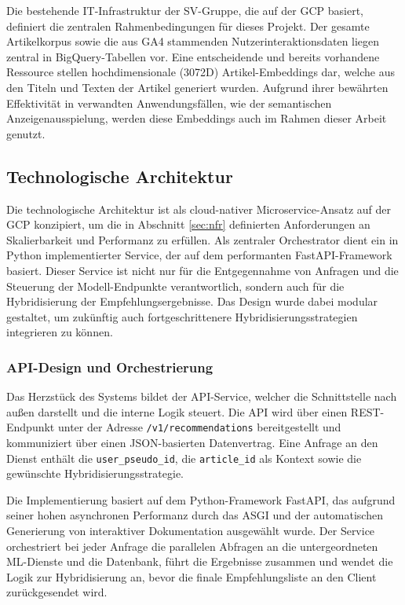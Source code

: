 Die bestehende IT-Infrastruktur der SV-Gruppe, die auf der \ac{GCP} basiert, definiert die zentralen Rahmenbedingungen für dieses Projekt. 
Der gesamte Artikelkorpus sowie die aus \ac{GA4} stammenden Nutzerinteraktionsdaten liegen zentral in BigQuery-Tabellen vor. 
Eine entscheidende und bereits vorhandene Ressource stellen hochdimensionale (3072D) Artikel-Embeddings dar, 
welche aus den Titeln und Texten der Artikel generiert wurden. Aufgrund ihrer bewährten Effektivität in verwandten Anwendungsfällen, 
wie der semantischen Anzeigenausspielung, werden diese Embeddings auch im Rahmen dieser Arbeit genutzt.

\subsection{Technologische Architektur}

Die technologische Architektur ist als cloud-nativer Microservice-Ansatz auf der \ac{GCP} konzipiert,
um die in Abschnitt \ref{sec:nfr} definierten Anforderungen an Skalierbarkeit und Performanz zu erfüllen. 
Als zentraler Orchestrator dient ein in Python implementierter Service, der auf dem performanten FastAPI-Framework basiert. 
Dieser Service ist nicht nur für die Entgegennahme von Anfragen und die Steuerung der Modell-Endpunkte verantwortlich, 
sondern auch für die Hybridisierung der Empfehlungsergebnisse. Das Design wurde dabei modular gestaltet, 
um zukünftig auch fortgeschrittenere Hybridisierungsstrategien integrieren zu können.
\subsubsection{API-Design und Orchestrierung}
\label{sec:api_design}

Das Herzstück des Systems bildet der API-Service, welcher die Schnittstelle nach außen darstellt und die interne Logik steuert. 
Die API wird über einen REST-Endpunkt unter der Adresse \texttt{/v1/recommendations} bereitgestellt und kommuniziert über einen 
JSON-basierten Datenvertrag. Eine Anfrage an den Dienst enthält die \texttt{user\_pseudo\_id}, die \texttt{article\_id} 
als Kontext sowie die gewünschte Hybridisierungsstrategie. 

Die Implementierung basiert auf dem Python-Framework FastAPI, das aufgrund seiner hohen asynchronen Performanz durch das \ac{ASGI} und 
der automatischen Generierung von interaktiver Dokumentation ausgewählt wurde. Der Service orchestriert bei 
jeder Anfrage die parallelen Abfragen an die untergeordneten ML-Dienste und die Datenbank, führt die Ergebnisse zusammen 
und wendet die Logik zur Hybridisierung an, bevor die finale Empfehlungsliste an den Client zurückgesendet wird.

